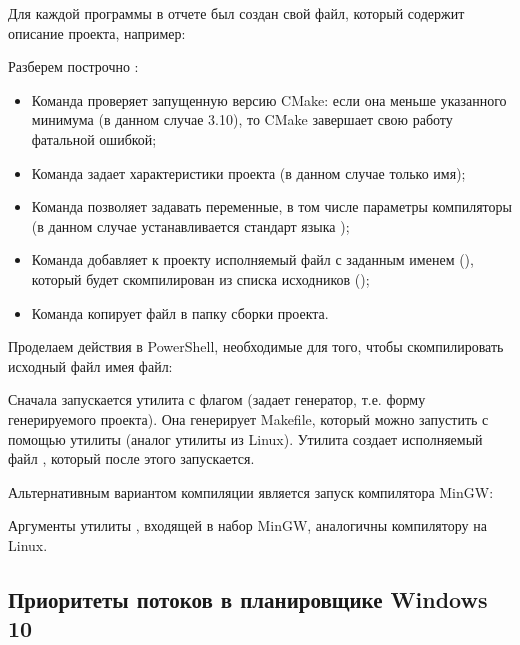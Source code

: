 Для каждой программы в отчете был создан свой  файл, который содержит описание проекта, например:



Разберем построчно :

\begin{itemize}
	\item Команда  проверяет запущенную версию CMake: если она меньше указанного минимума (в данном случае 3.10), то CMake завершает свою работу фатальной ошибкой;
	\item Команда  задает характеристики проекта (в данном случае только имя);
	\item Команда  позволяет задавать переменные, в том числе параметры компиляторы (в данном случае устанавливается стандарт языка );
	\item Команда  добавляет к проекту исполняемый файл с заданным именем (), который будет скомпилирован из списка исходников ();
	\item Команда  копирует файл  в папку сборки проекта.
\end{itemize}

Проделаем действия в PowerShell, необходимые для того, чтобы скомпилировать исходный файл имея  файл:


Сначала запускается утилита  с флагом  (задает генератор, т.е. форму генерируемого проекта). Она генерирует Makefile, который можно запустить с помощью утилиты  (аналог утилиты  из Linux). Утилита  создает исполняемый файл , который после этого запускается.

Альтернативным вариантом компиляции является запуск компилятора MinGW:


Аргументы утилиты , входящей в набор MinGW, аналогичны компилятору  на Linux.

\newpage

\subsection*{Приоритеты потоков в планировщике Windows 10}

